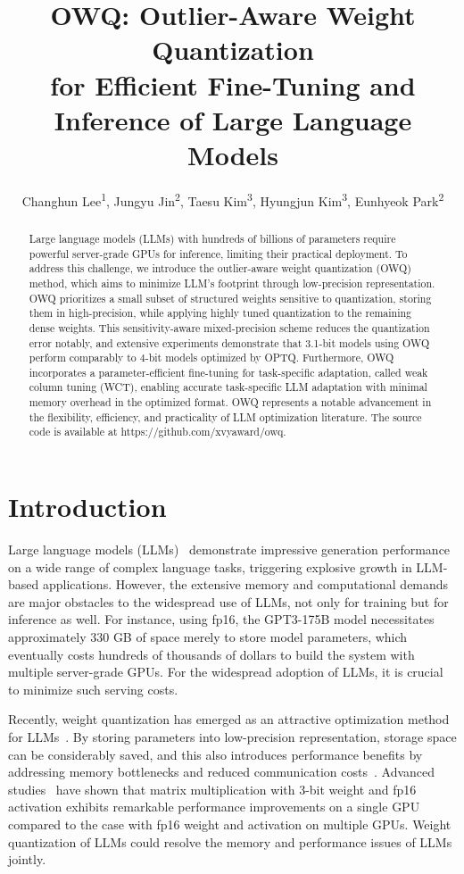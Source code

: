 \documentclass[letterpaper]{article} %
\title{OWQ: Outlier-Aware Weight Quantization \\for Efficient Fine-Tuning and Inference of Large Language Models}
\author{
    Changhun Lee\textsuperscript{\rm 1}\equalcontrib,
    Jungyu Jin\textsuperscript{\rm 2}\equalcontrib,
    Taesu Kim\textsuperscript{\rm 3},
    Hyungjun Kim\textsuperscript{\rm 3},
    Eunhyeok Park\textsuperscript{\rm 2}
}
\begin{document}
\maketitle

\begin{abstract}
Large language models (LLMs) with hundreds of billions of parameters require powerful server-grade GPUs for inference, limiting their practical deployment. To address this challenge, we introduce the outlier-aware weight quantization (OWQ) method, which aims to minimize LLM's footprint through low-precision representation. OWQ prioritizes a small subset of structured weights sensitive to quantization, storing them in high-precision, while applying highly tuned quantization to the remaining dense weights. This sensitivity-aware mixed-precision scheme reduces the quantization error notably, and extensive experiments demonstrate that 3.1-bit models using OWQ perform comparably to 4-bit models optimized by OPTQ. Furthermore, OWQ incorporates a parameter-efficient fine-tuning for task-specific adaptation, called weak column tuning (WCT), enabling accurate task-specific LLM adaptation with minimal memory overhead in the optimized format. OWQ represents a notable advancement in the flexibility, efficiency, and practicality of LLM optimization literature. The source code is available at https://github.com/xvyaward/owq.
\end{abstract}

\section{Introduction}
Large language models (LLMs)~\cite{brown2020language,radford2019language,scao2022bloom,touvron2023llama,zhang2022opt} demonstrate impressive generation performance on a wide range of complex language tasks, triggering explosive growth in LLM-based applications.
However, the extensive memory and computational demands are major obstacles to the widespread use of LLMs, not only for training but for inference as well. For instance, using fp16, the GPT3-175B model necessitates approximately 330 GB of space merely to store model parameters, which eventually costs hundreds of thousands of dollars to build the system with multiple server-grade GPUs. For the widespread adoption of LLMs, it is crucial to minimize such serving costs.

Recently, weight quantization has emerged as an attractive optimization method for LLMs~\cite{frantar2023optq}. By storing parameters into low-precision representation, storage space can be considerably saved, and this also introduces performance benefits by addressing memory bottlenecks and reduced communication costs~\cite{park2023lutgemm}. Advanced studies~\cite{frantar2023optq, park2023lutgemm} have shown that matrix multiplication with 3-bit weight and fp16 activation exhibits remarkable performance improvements on a single GPU compared to the case with fp16 weight and activation on multiple GPUs. Weight quantization of LLMs could resolve the memory and performance issues of LLMs jointly. 
\end{document}
